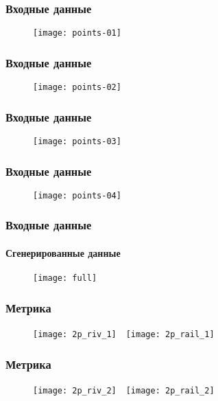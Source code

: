 \begin{frame}
    \frametitle{Входные данные}
    \begin{figure}
        \centering
        \texttt{[image: points-01]}
    \end{figure}
\end{frame}

\begin{frame}
    \frametitle{Входные данные}
    \begin{figure}
        \centering
        \texttt{[image: points-02]}
    \end{figure}
\end{frame}

\begin{frame}
    \frametitle{Входные данные}
    \begin{figure}
        \centering
        \texttt{[image: points-03]}
    \end{figure}
\end{frame}

\begin{frame}
    \frametitle{Входные данные}
    \begin{figure}
        \centering
        \texttt{[image: points-04]}
    \end{figure}
\end{frame}

\begin{frame}
    \frametitle{Входные данные}
    \framesubtitle{Сгенерированные данные}
    \begin{figure}
        \centering
        \texttt{[image: full]}
    \end{figure}
\end{frame}

\begin{frame}
    \frametitle{Метрика}
    \begin{figure}
        \centering
        \texttt{[image: 2p\_riv\_1]}\ \
        \texttt{[image: 2p\_rail\_1]}
    \end{figure}
\end{frame}

\begin{frame}
    \frametitle{Метрика}
    \begin{figure}
        \centering
        \texttt{[image: 2p\_riv\_2]}\ \
        \texttt{[image: 2p\_rail\_2]}
    \end{figure}
\end{frame}

